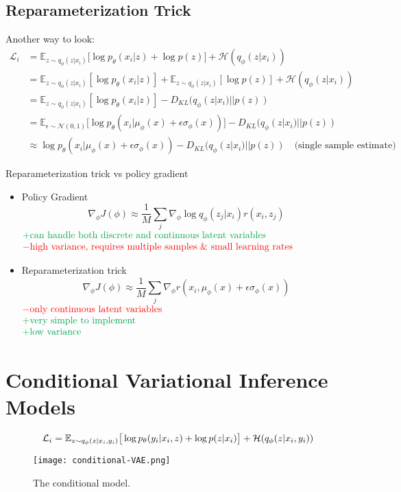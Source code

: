 \subsection{Reparameterization Trick}
Another way to look:
\begin{align}
	\mathcal{L}_i &= \mathbb{E}_{z\sim q_\phi(z|x_i)} \big[\log p_\theta(x_i|z) + \log p(z)\big] + \mathcal{H}(q_\phi(z|x_i))\\
	&= \mathbb{E}_{z\sim q_\phi(z|x_i)} [\log p_\theta(x_i|z)] + \mathbb{E}_{z\sim q_\phi(z|x_i)}[\log p(z)] + \mathcal{H}(q_\phi(z|x_i))\\
	&= \mathbb{E}_{z\sim q_\phi(z|x_i)} [\log p_\theta(x_i|z)] -D_{KL} (q_\phi(z|x_i) || p(z))\\
	&= \mathbb{E}_{\epsilon \sim \mathcal{N}(0,1)} \big[\log p_\theta(x_i|\mu_\phi(x) + \epsilon \sigma_\phi(x))\big] -D_{KL} (q_\phi(z|x_i) || p(z))\\
	&\approx \log p_\theta(x_i|\mu_\phi(x) + \epsilon \sigma_\phi(x)) -D_{KL} (q_\phi(z|x_i) || p(z)) \quad \text{(single sample estimate)}
\end{align}

\note Reparameterization trick \ac{vs} policy gradient
\begin{itemize}
	\item Policy Gradient
	\[\nabla_\phi J(\phi) \approx \frac{1}{M} \sum_j \nabla_\phi \log q_\phi(z_j|x_i) r(x_i, z_j) \]
	$\begin{matrix*}[l]
		\color{Green} + \text{can handle both discrete and continuous latent variables}\\
		\color{red} - \text{high variance, requires multiple samples \& small learning rates}
	\end{matrix*}$
	\item Reparameterization trick
	\[\nabla_\phi J(\phi) \approx \frac{1}{M} \sum_j \nabla_\phi r(x_i, \mu_\phi(x) + \epsilon \sigma_\phi(x))\]
	$\begin{matrix*}[l]
		\color{red} - \text{only continuous latent variables}\\
		\color{Green} + \text{very simple to implement}\\
		\color{Green} + \text{low variance}
	\end{matrix*}$
\end{itemize}

\section{Conditional Variational Inference Models}
\begin{equation}
	\mathcal{L}_i = \mathbb{E}_{z\sim q_\phi(z|x_i, y_i)} \big[\log p_\theta(y_i|x_i, z) + \log p(z|x_i)\big] + \mathcal{H}(q_\phi(z|x_i, y_i))\\
\end{equation}
\begin{figure}[hbt!]
	\centering
	\texttt{[image: conditional-VAE.png]}
	\caption{The conditional model.}
	\label{fig:conditional-vae}
\end{figure}

